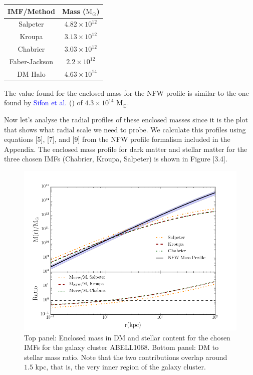 \begin{center}
\begin{tabular}{c c}
IMF/Method & Mass ($\text{M}_{\odot}$)\tabularnewline
\hline 
\hline
Salpeter & $4.82\times10^{12}$\tabularnewline
Kroupa & $3.13\times10^{12}$\tabularnewline
Chabrier & $3.03\times10^{12}$\tabularnewline
Faber-Jackson & $2.2\times10^{12}$\tabularnewline
DM Halo & $4.63\times10^{14}$\tabularnewline
\end{tabular}
\end{center}

The value found for the enclosed mass for the NFW profile is similar to the one found by \textcolor{blue}{Sifon et al.} (\citeyear{Reference9}) of $4.3\times 10^{14}$ $\text{M}_{\odot}$.

Now let's analyse the radial profiles of these enclosed masses since it is the plot that shows what radial scale we need to probe. We calculate this profiles using equations [5], [7], and [9] from the NFW profile formalism included in the Appendix. The enclosed mass profile for dark matter and stellar matter for the three chosen IMFs (Chabrier, Kroupa, Salpeter) is shown in Figure [3.4].

\begin{figure}[H]
\centering
\includegraphics[width=12cm]{images/DM_fraction_all_IMFs.png}
\caption[Enclosed mass and DM to stellar mass ratio for a galaxy cluster]{Top panel: Enclosed mass in DM and stellar content for the chosen IMFs for the galaxy cluster ABELL1068. Bottom panel: DM to stellar mass ratio. Note that the two contributions overlap around $1.5 $ kpc, that is, the very inner region of the galaxy cluster.}
\end{figure}

